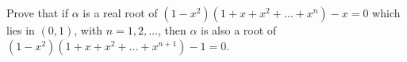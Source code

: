 Prove that if $\alpha$ is a real root of $(1 - x^2)(1 + x + x^2 + \dots + x^n) - x = 0$
which lies in $(0, 1)$, with $n = 1, 2, \dots$, then $\alpha$ is also a root of
$(1 - x^2)(1 + x + x^2 + \dots + x^{n+1}) - 1 = 0$.
